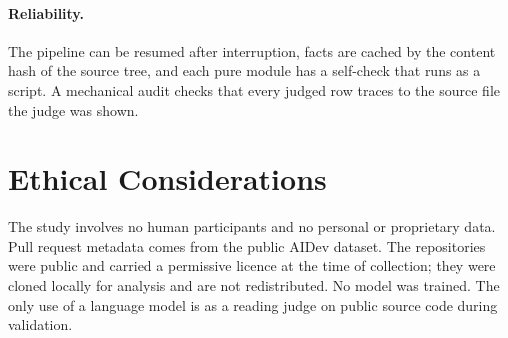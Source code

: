 \paragraph{Reliability.} The pipeline can be resumed after interruption, facts are cached by the
content hash of the source tree, and each pure module has a self-check that runs as a script. A
mechanical audit checks that every judged row traces to the source file the judge was shown.

\section{Ethical Considerations}
\label{sec:ethics}

The study involves no human participants and no personal or proprietary data. Pull request metadata
comes from the public AIDev dataset. The repositories were public and carried a permissive licence
at the time of collection; they were cloned locally for analysis and are not redistributed. No model
was trained. The only use of a language model is as a reading judge on public source code during
validation.
